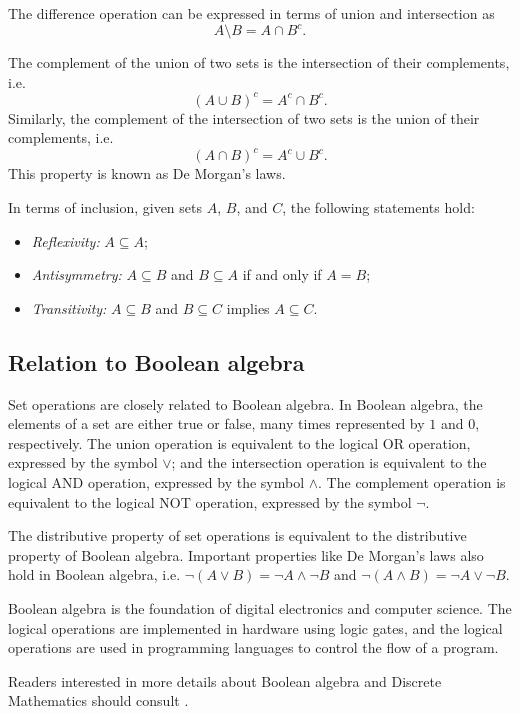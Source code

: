 The difference operation can be expressed in terms of union and intersection as
\[
  A \setminus B = A \cap B^c\text{.}
\]

The complement of the union of two sets is the intersection of their complements, i.e.
\[
  (A \cup B)^c = A^c \cap B^c\text{.}
\]
Similarly, the complement of the intersection of two sets is the union of their complements, i.e.
\[
  (A \cap B)^c = A^c \cup B^c\text{.}
\]
This property is known as De Morgan's laws.

In terms of inclusion, given sets $A$, $B$, and $C$, the following statements hold:
\begin{itemize}
  \item \emph{Reflexivity:} $A \subseteq A$;
  \item \emph{Antisymmetry:} $A \subseteq B$ and $B \subseteq A$ if and only if $A = B$;
  \item \emph{Transitivity:} $A \subseteq B$ and $B \subseteq C$ implies $A \subseteq C$.
\end{itemize}

\subsection{Relation to Boolean algebra}

Set operations are closely related to Boolean algebra.  In Boolean algebra, the elements
of a set are either true or false, many times represented by $1$ and $0$, respectively.
The union operation is equivalent to the logical OR operation, expressed by the symbol
$\lor$; and the intersection operation is equivalent to the logical AND operation,
expressed by the symbol $\land$.  The complement operation is equivalent to the logical
NOT operation, expressed by the symbol $\lnot$.

The distributive property of set operations is equivalent to the distributive property of
Boolean algebra.  Important properties like De Morgan's laws also hold in Boolean algebra,
i.e. $\lnot (A \lor B) = \lnot A \land \lnot B$ and $\lnot (A \land B) = \lnot A \lor
\lnot B$.

Boolean algebra is the foundation of digital electronics and computer science.  The
logical operations are implemented in hardware using logic gates, and the logical
operations are used in programming languages to control the flow of a program.

Readers interested in more details about Boolean algebra and Discrete Mathematics
should consult \textcite{Rosen2018}.

